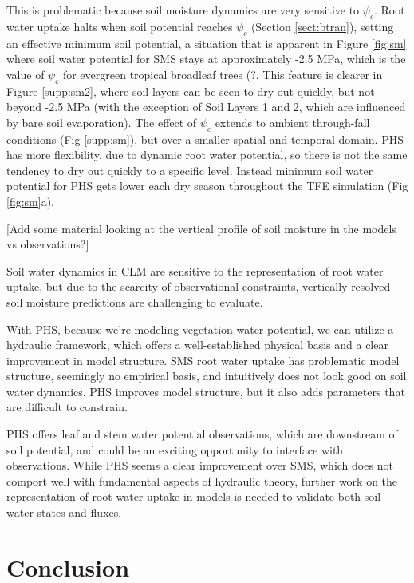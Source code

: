 \documentclass[draft,linenumbers]{agujournal}
\begin{document}
    This is problematic because soil moisture dynamics are very sensitive to $\psi_c$.    Root water uptake halts when soil potential reaches $\psi_c$ (Section \ref{sect:btran}), setting an effective minimum soil potential, a situation that is apparent in Figure \ref{fig:sm} where soil water potential for SMS  stays at approximately -2.5 MPa, which is the value of $\psi_c$ for evergreen tropical broadleaf trees (?.    This feature is clearer in Figure \ref{supp:sm2}, where soil layers can be seen to dry out quickly, but not beyond -2.5 MPa     (with the exception of Soil Layers 1 and 2, which are influenced by bare soil evaporation).    The effect of $\psi_c$ extends to ambient through-fall conditions (Fig \ref{supp:sm}), but over a smaller spatial and temporal domain.    PHS has more flexibility, due to dynamic root water potential, so there is not the same tendency to dry out quickly to a specific level.    Instead minimum soil water potential for PHS gets lower each dry season throughout the TFE simulation (Fig \ref{fig:sm}a).
    
    [Add some material looking at the vertical profile of soil moisture in the models vs observations?] 
    
    
    Soil water dynamics in CLM are sensitive to the representation of root water uptake, but due to the scarcity of observational constraints, vertically-resolved soil moisture predictions are challenging to evaluate.
    
    
    
    
    With PHS, because we're modeling vegetation water potential, we can utilize a hydraulic framework, 
    which offers a well-established physical basis and a clear improvement in model structure.
    SMS root water uptake has problematic model structure, seemingly no empirical basis, and intuitively does not look good on soil water dynamics.
    PHS improves model structure, but it also adds parameters that are difficult to constrain. 

    PHS offers leaf and stem water potential observations, which are downstream of soil potential, and could be an exciting opportunity to interface with observations. 
    While PHS seems a clear improvement over SMS, which does not comport well with fundamental aspects of hydraulic theory, further work on the representation of root water uptake in models is needed to validate both soil water states and fluxes.
    


\section{Conclusion}
\end{document}
